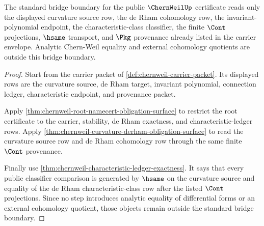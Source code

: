 \begin{theorem}
\label{thm:chernweil-standard-bridge-boundary}
The standard bridge boundary for the public $\ChernWeilUp$ certificate reads
only the displayed curvature source row, the de Rham cohomology row, the
invariant-polynomial endpoint, the characteristic-class classifier, the finite
$\Cont$ projections, $\hsame$ transport, and $\Pkg$ provenance already listed in
the carrier envelope. Analytic Chern-Weil equality and external cohomology
quotients are outside this bridge boundary.
\end{theorem}
\begin{proof}
Start from the carrier packet of \autoref{def:chernweil-carrier-packet}. Its
displayed rows are the curvature source, de Rham target, invariant polynomial,
connection ledger, characteristic endpoint, and provenance packet.

Apply \autoref{thm:chernweil-root-namecert-obligation-surface} to restrict the
root certificate to the carrier, stability, de Rham exactness, and
characteristic-ledger rows. Apply
\autoref{thm:chernweil-curvature-derham-obligation-surface} to read the
curvature source row and de Rham cohomology row through the same finite
$\Cont$ provenance.

Finally use \autoref{thm:chernweil-characteristic-ledger-exactness}. It says
that every public classifier comparison is generated by $\hsame$ on the
curvature source and equality of the de Rham characteristic-class row after the
listed $\Cont$ projections. Since no step introduces analytic equality of
differential forms or an external cohomology quotient, those objects remain
outside the standard bridge boundary.
\end{proof}

